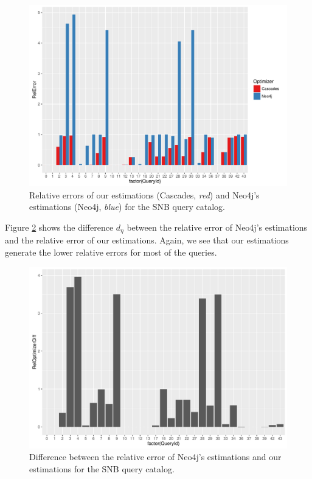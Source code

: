 \begin{figure}
  \centering
  \includegraphics[width=\textwidth]{figures/eval/rel_error_snb.pdf}
  \caption{Relative errors of our estimations (Cascades, \emph{red})
           and Neo4j's estimations (Neo4j, \emph{blue})
           for the SNB query catalog.}
  \label{fig:rel-error-snb}
\end{figure}

Figure \ref{fig:rel-error-diff-snb} shows the difference $d_\eta$
between the relative
error of Neo4j's estimations and the relative error of our estimations.
Again, we see that our estimations generate the lower relative
errors for most of the queries.

\begin{figure}
  \centering
  \includegraphics[width=\textwidth]{figures/eval/rel_error_diff_snb.pdf}
  \caption{Difference between the relative error of Neo4j's estimations
           and our estimations for the SNB query catalog.}
  \label{fig:rel-error-diff-snb}
\end{figure}

